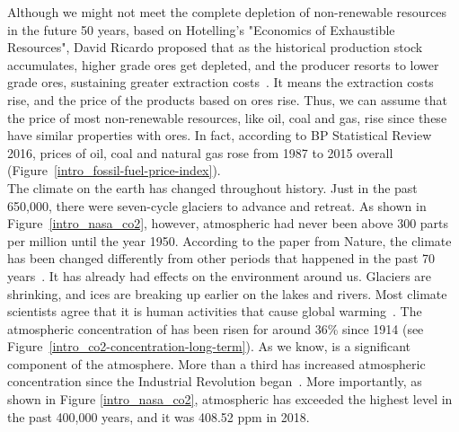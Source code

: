 Although we might not meet the complete depletion of non-renewable resources in the future 50 years, based on Hotelling’s "Economics of Exhaustible Resources", David Ricardo proposed that as the historical production stock accumulates, higher grade ores get depleted, and the producer resorts to lower grade ores, sustaining greater extraction costs~\cite{devarajan1981hotelling}. It means the extraction costs rise, and the price of the products based on ores rise. Thus, we can assume that the price of most non-renewable resources, like oil, coal and gas, rise since these have similar properties with ores. In fact, according to BP Statistical Review 2016, prices of oil, coal and natural gas rose from 1987 to 2015 overall (Figure~\ref{intro_fossil-fuel-price-index}).\\

The climate on the earth has changed throughout history. Just in the past 650,000, there were seven-cycle glaciers to advance and retreat. As shown in Figure~\ref{intro_nasa_co2}, however, atmospheric  had never been above 300 parts per million until the year 1950. According to the paper from Nature, the climate has been changed differently from other periods that happened in the past 70 years~\cite{parmesan2003globally}. It has already had effects on the environment around us. Glaciers are shrinking, and ices are breaking up earlier on the lakes and rivers. Most climate scientists agree that it is human activities that cause global warming~\cite{epic337530}. The atmospheric concentration of  has been risen for around 36\% since 1914 (see Figure~\ref{intro_co2-concentration-long-term}). As we know,  is a significant component of the atmosphere. More than a third has increased atmospheric  concentration since the Industrial Revolution began~\cite{epic337530}. More importantly, as shown in Figure \ref{intro_nasa_co2}, atmospheric  has exceeded the highest level in the past 400,000 years, and it was 408.52 ppm in 2018.\\

